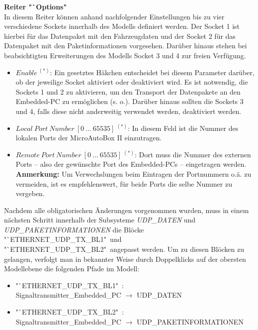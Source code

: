 \documentclass[fontsize = 12pt, paper = a4]{scrreprt}
\begin{document}
\textbf{Reiter "`Options"} \\

In diesem Reiter können anhand nachfolgender Einstellungen bis zu vier verschiedene Sockets innerhalb des Modells definiert werden. Der Socket 1 ist hierbei für das Datenpaket mit den Fahrzeugdaten und der Socket 2 für das Datenpaket mit den Paketinformationen vorgesehen. Darüber hinaus stehen bei beabsichtigten Erweiterungen des Modells Socket 3 und 4 zur freien Verfügung.

\begin{itemize}

\item \textit{$Enable \ ^{(*)}$}: Ein gesetztes Häkchen entscheidet bei diesem Parameter darüber, ob der jeweilige Socket aktiviert oder deaktiviert wird. Es ist notwendig, die Sockets 1 und 2 zu aktivieren, um den Transport der Datenpakete an den Embedded-PC zu ermöglichen (s. o.). Darüber hinaus sollten die Sockets 3 und 4, falls diese nicht anderweitig verwendet werden, deaktiviert werden.  

\item \textit{$Local \ Port \ Number \ [0 \ ... \ 65535] \ ^{(*)}$}: In diesem Feld ist die Nummer des lokalen Ports der MicroAutoBox II einzutragen. 

\item \textit{$Remote \ Port \ Number \ [0 \ ... \ 65535] \ ^{(*)}$}:
Dort muss die Nummer des externen Ports -- also der gewünschte Port des Embedded-PCs -- eingetragen werden. \\ 

\textbf{Anmerkung:} Um Verwechslungen beim Eintragen der Portnummern o.ä. zu vermeiden, ist es empfehlenswert, für beide Ports die selbe Nummer zu vergeben. 

\end{itemize} 

\newpage

Nachdem alle obligatorischen Änderungen vorgenommen wurden, muss in einem nächsten Schritt innerhalb der Subsysteme \textit{UDP\_DATEN} und \textit{UDP\_PAKETINFORMATIONEN} die Blöcke "`ETHERNET\_UDP\_TX\_BL1"\ und "`ETHERNET\_UDP\_TX\_BL2"\ angepasst werden. Um zu diesen Blöcken zu gelangen, verfolgt man in bekannter Weise durch Doppelklicks auf der obersten Modellebene die folgenden Pfade im Modell: 

\begin{itemize}[leftmargin=*]

\item "`ETHERNET\_UDP\_TX\_BL1"\ : \\ Signaltransmitter\_Embedded\_PC $\rightarrow$ UDP\_DATEN 

\item "`ETHERNET\_UDP\_TX\_BL2"\ : \\ Signaltransmitter\_Embedded\_PC $\rightarrow$ UDP\_PAKETINFORMATIONEN

\end{itemize}
\end{document}
